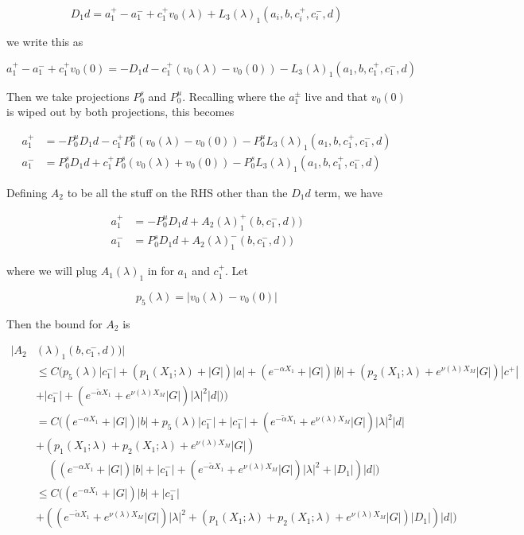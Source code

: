 \documentclass[12pt]{article}
\begin{document}
\begin{enumerate}
\[
D_1 d = a_1^+ - a_1^- + c_1^+ v_0(\lambda) + L_3(\lambda)_1(a_i, b, c_i^+, c_i^-, d)
\]

we write this as

\[
a_1^+ - a_1^- + c_1^+ v_0(0) = -D_1 d - c_1^+ (v_0(\lambda) - v_0(0)) - L_3(\lambda)_1(a_1, b, c_1^+, c_1^-, d)
\]

Then we take projections $P^s_0$ and $P^u_0$. Recalling where the $a_1^\pm$ live and that $v_0(0)$ is wiped out by both projections, this becomes 

\begin{align*}
a_1^+ &= -P^u_0 D_1 d - c_1^+ P^u_0 (v_0(\lambda) - v_0(0)) - P^u_0 L_3(\lambda)_1(a_1, b, c_1^+, c_1^-, d) \\
a_1^- &=  P^s_0 D_1 d + c_1^+ P^s_0 (v_0(\lambda) + v_0(0)) - P^s_0 L_3(\lambda)_1(a_1, b, c_1^+, c_1^-, d)
\end{align*}

Defining $A_2$ to be all the stuff on the RHS other than the $D_1 d$ term, we have

\begin{align*}
a_1^+ &= -P^u_0 D_1 d + A_2(\lambda)_1^+(b, c_1^-, d))\\
a_1^- &=  P^s_0 D_1 d + A_2(\lambda)_1^-(b, c_1^-, d))
\end{align*}

where we will plug $A_1(\lambda)_1$ in for $a_1$ and $c_1^+$. Let 

\[
p_5(\lambda) = |v_0(\lambda) - v_0(0)| 
\]

Then the bound for $A_2$ is

\begin{align*}
|A_2&(\lambda)_1(b, c_1^-, d))| \\
&\leq C( p_5(\lambda) |c_1^-| + (p_1(X_1; \lambda) + |G|)|a| + (e^{-\alpha X_1} + |G|) |b| + ( p_2(X_1; \lambda) + e^{\nu(\lambda)X_M} |G|) |c^+| \\
&+ |c_1^-| + (e^{-\tilde{\alpha} X_1} + e^{\nu(\lambda)X_M} |G|) |\lambda|^2 |d| ) ) \\
&= C( (e^{-\alpha X_1} + |G|) |b| + p_5(\lambda) |c_1^-| + |c_1^-| + (e^{-\tilde{\alpha} X_1} + e^{\nu(\lambda)X_M} |G|) |\lambda|^2 |d| \\
&+ (p_1(X_1; \lambda) + p_2(X_1; \lambda) + e^{\nu(\lambda)X_M} |G|) \\
&\:\:\:\:\:( ( e^{-\alpha X_1} + |G|) |b| + |c_1^-| + (e^{-\tilde{\alpha} X_1} + e^{\nu(\lambda)X_M} |G|) |\lambda|^2 + |D_1|) |d| )\\
&\leq C( (e^{-\alpha X_1} + |G|) |b| + |c_1^-| \\
&+ ((e^{-\tilde{\alpha} X_1} + e^{\nu(\lambda)X_M} |G|) |\lambda|^2 + (p_1(X_1; \lambda) + p_2(X_1; \lambda) + e^{\nu(\lambda)X_M} |G|)|D_1|)|d| )
\end{align*}


\end{enumerate}
\end{document}
